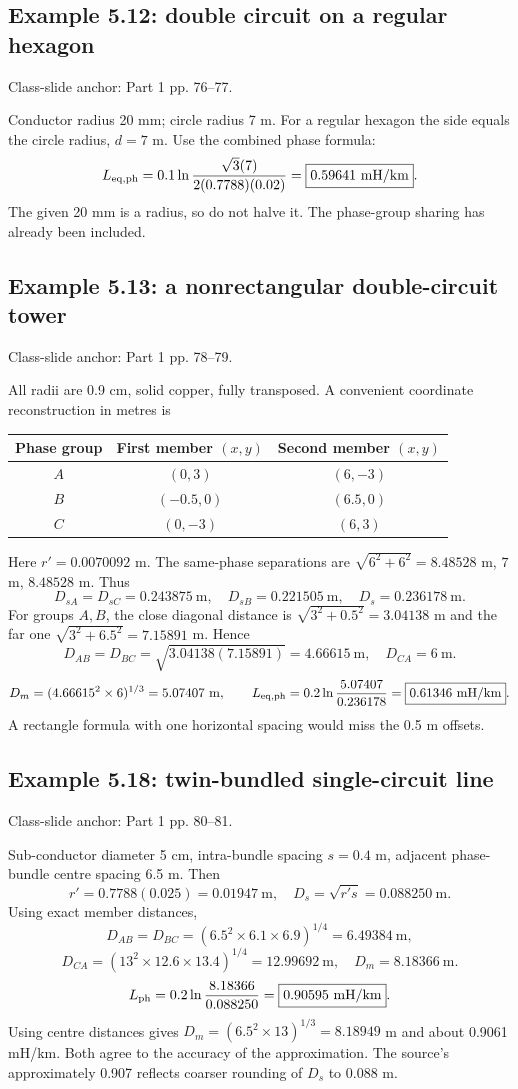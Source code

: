 \documentclass[11pt,a4paper]{article}
\newcommand{\slides}[1]{{\small\color{muted}\textsf{Class-slide anchor: #1.}}\par}
\newcommand{\ans}[1]{\boxed{#1}}
\begin{document}
\subsection{Example 5.12: double circuit on a regular hexagon}
\slides{Part 1 pp. 76--77}
Conductor radius 20 mm; circle radius 7 m. For a regular hexagon the side equals the circle radius, $d=7$ m. Use the combined phase formula:
\[
 L_{\rm eq,ph}=0.1\ln\frac{\sqrt3(7)}{2(0.7788)(0.02)}
 =\ans{0.59641\ \mathrm{mH/km}}.
\]
The given 20 mm is a radius, so do not halve it. The phase-group sharing has already been included.
\subsection{Example 5.13: a nonrectangular double-circuit tower}
\slides{Part 1 pp. 78--79}
All radii are 0.9 cm, solid copper, fully transposed. A convenient coordinate reconstruction in metres is
\begin{center}\small
\begin{tabular}{ccc}
\toprule Phase group & First member $(x,y)$ & Second member $(x,y)$\\\midrule
$A$ & $(0,3)$ & $(6,-3)$\\
$B$ & $(-0.5,0)$ & $(6.5,0)$\\
$C$ & $(0,-3)$ & $(6,3)$\\\bottomrule
\end{tabular}\end{center}
Here $r'=0.0070092$ m. The same-phase separations are $\sqrt{6^2+6^2}=8.48528$ m, $7$ m, $8.48528$ m. Thus
\[
 D_{sA}=D_{sC}=0.243875\ \mathrm m,\quad D_{sB}=0.221505\ \mathrm m,\quad
 D_s=0.236178\ \mathrm m.
\]
For groups $A,B$, the close diagonal distance is $\sqrt{3^2+0.5^2}=3.04138$ m and the far one $\sqrt{3^2+6.5^2}=7.15891$ m. Hence
\[
 D_{AB}=D_{BC}=\sqrt{3.04138(7.15891)}=4.66615\ \mathrm m,
 \quad D_{CA}=6\ \mathrm m.
\]
\[
 D_m=(4.66615^2\times6)^{1/3}=5.07407\ \mathrm m,\qquad
 L_{\rm eq,ph}=0.2\ln\frac{5.07407}{0.236178}
 =\ans{0.61346\ \mathrm{mH/km}}.
\]
A rectangle formula with one horizontal spacing would miss the 0.5 m offsets.
\subsection{Example 5.18: twin-bundled single-circuit line}
\slides{Part 1 pp. 80--81}
Sub-conductor diameter 5 cm, intra-bundle spacing $s=0.4$ m, adjacent phase-bundle centre spacing 6.5 m. Then
\[
 r'=0.7788(0.025)=0.01947\ \mathrm m,\quad D_s=\sqrt{r's}=0.088250\ \mathrm m.
\]
Using exact member distances,
\[
 D_{AB}=D_{BC}=(6.5^2\times6.1\times6.9)^{1/4}=6.49384\ \mathrm m,
\]
\[
 D_{CA}=(13^2\times12.6\times13.4)^{1/4}=12.99692\ \mathrm m,
 \quad D_m=8.18366\ \mathrm m.
\]
\[
 L_{\rm ph}=0.2\ln\frac{8.18366}{0.088250}=\ans{0.90595\ \mathrm{mH/km}}.
\]
Using centre distances gives $D_m=(6.5^2\times13)^{1/3}=8.18949$ m and about 0.9061 mH/km. Both agree to the accuracy of the approximation. The source's approximately 0.907 reflects coarser rounding of $D_s$ to 0.088 m.
\end{document}
